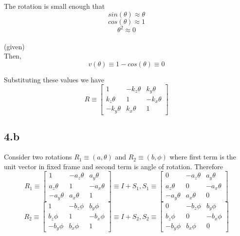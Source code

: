 \documentclass[12pt]{article}
\newcommand{\given}{{\\ \color{blue} \hspace*{\fill}(given)} \\}
\begin{document}
The rotation is small enough that
\[
  sin(\theta) \approx \theta
\]
\[
  cos(\theta) \approx 1
\]
\[
  \theta^2 \approx 0
\]
\given

Then,
\[
  v(\theta) \equiv 1 - cos(\theta) \equiv 0
\]

Substituting these values we have
\[
  R \equiv
  \begin{bmatrix}
    1 & -k_z\theta & k_y\theta\\
     k_z\theta & 1 & -k_x\theta \\
     -k_y\theta & k_x\theta & 1
  \end{bmatrix}
\]
\pagebreak

\subsection*{4.b}
Consider two rotations $R_1 \equiv (a, \theta)$ and $R_2 \equiv (b, \phi)$ where first term is the unit vector in fixed frame and second term is angle of rotation.
Therefore
\[
  R_1 \equiv
  \begin{bmatrix}
    1 & -a_z\theta & a_y\theta\\
     a_z\theta & 1 & -a_x\theta \\
     -a_y\theta & a_x\theta & 1
  \end{bmatrix}
  \equiv
  I + S_1
  ,
  S_1 \equiv
  \begin{bmatrix}
    0 & -a_z\theta & a_y\theta\\
     a_z\theta & 0 & -a_x\theta \\
     -a_y\theta & a_x\theta & 0
  \end{bmatrix}
\]
\[
  R_2 \equiv
  \begin{bmatrix}
    1 & -b_z\phi & b_y\phi\\
     b_z\phi & 1 & -b_x\phi \\
     -b_y\phi & b_x\phi & 1
  \end{bmatrix}
  \equiv
  I + S_2
  ,
  S_2 \equiv
  \begin{bmatrix}
    0 & -b_z\phi & b_y\phi\\
     b_z\phi & 0 & -b_x\phi \\
     -b_y\phi & b_x\phi & 0
  \end{bmatrix}
\]
\end{document}
